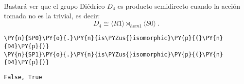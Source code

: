 \begin{enumerate}
Bastará ver que el grupo Diédrico $D_4$ es producto semidirecto cuando la acción tomada no es la trivial, es decir:
\[
    D_4 \cong \langle R1 \rangle \rtimes_{hom1} \langle S0 \rangle \: .
\]
    \begin{tcolorbox}[breakable, size=fbox, boxrule=1pt, pad at break*=1mm,colback=cellbackground, colframe=cellborder]
\begin{Verbatim}[commandchars=\\\{\}]
\PY{n}{SP0}\PY{o}{.}\PY{n}{is\PYZus{}isomorphic}\PY{p}{(}\PY{n}{D4}\PY{p}{)}
\PY{n}{SP1}\PY{o}{.}\PY{n}{is\PYZus{}isomorphic}\PY{p}{(}\PY{n}{D4}\PY{p}{)}
\end{Verbatim}
\end{tcolorbox}




            \begin{tcolorbox}[breakable, size=fbox, boxrule=.5pt, pad at break*=1mm, opacityfill=0]
\begin{Verbatim}[commandchars=\\\{\}]
False, True
\end{Verbatim}
\end{tcolorbox}
    


\end{enumerate}



